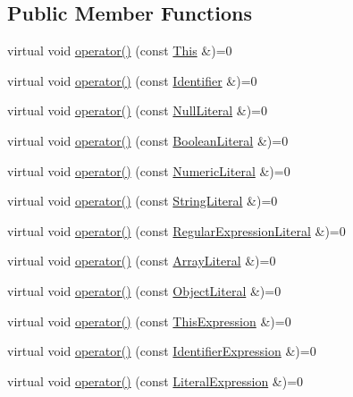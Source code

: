 \subsection*{Public Member Functions}
\begin{DoxyCompactItemize}
\item 
virtual void \hyperlink{struct_visitor_a7a043c9da4e7f8233db48afb82dbc7bc}{operator()} (const \hyperlink{struct_this}{This} \&)=0
\item 
virtual void \hyperlink{struct_visitor_a2d09687aa24b1b618c6205f8413c2dd3}{operator()} (const \hyperlink{struct_identifier}{Identifier} \&)=0
\item 
virtual void \hyperlink{struct_visitor_a2278ee24407bdc0d3addf887754d4c6c}{operator()} (const \hyperlink{struct_null_literal}{Null\+Literal} \&)=0
\item 
virtual void \hyperlink{struct_visitor_af3b394eaf1b9b1db22379aedcb234a2f}{operator()} (const \hyperlink{struct_boolean_literal}{Boolean\+Literal} \&)=0
\item 
virtual void \hyperlink{struct_visitor_a6d707fe0c1563b39aae3ecd7ddb5ab8f}{operator()} (const \hyperlink{struct_numeric_literal}{Numeric\+Literal} \&)=0
\item 
virtual void \hyperlink{struct_visitor_a6bab8ba66edf0cc73cb92073269e7848}{operator()} (const \hyperlink{struct_string_literal}{String\+Literal} \&)=0
\item 
virtual void \hyperlink{struct_visitor_aea90f9399628f301f8c25a62ce268097}{operator()} (const \hyperlink{struct_regular_expression_literal}{Regular\+Expression\+Literal} \&)=0
\item 
virtual void \hyperlink{struct_visitor_a46f9846468f2c12ddc585cfe0421e6f0}{operator()} (const \hyperlink{struct_array_literal}{Array\+Literal} \&)=0
\item 
virtual void \hyperlink{struct_visitor_ad85d9aa9718801a1a8233cf51d8f7055}{operator()} (const \hyperlink{struct_object_literal}{Object\+Literal} \&)=0
\item 
virtual void \hyperlink{struct_visitor_ae8eb5856c0ed7ff4840fa9045c886f59}{operator()} (const \hyperlink{struct_this_expression}{This\+Expression} \&)=0
\item 
virtual void \hyperlink{struct_visitor_ad804ffa8c84a6fa58b18980cd3ec71af}{operator()} (const \hyperlink{struct_identifier_expression}{Identifier\+Expression} \&)=0
\item 
virtual void \hyperlink{struct_visitor_a4f9ed19fc09fb7f31e8af350d028a5fd}{operator()} (const \hyperlink{struct_literal_expression}{Literal\+Expression} \&)=0

\end{DoxyCompactItemize}
